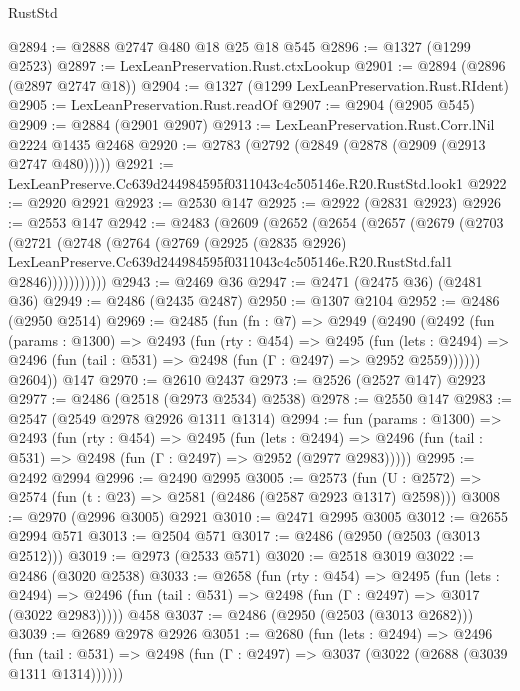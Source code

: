 \begin{lexlean}{RustStd}
\begin{coremodule}
@2894 := @2888 @2747 @480 @18 @25 @18 @545
@2896 := @1327 (@1299 @2523)
@2897 := LexLeanPreservation.Rust.ctxLookup
@2901 := @2894 (@2896 (@2897 @2747 @18))
@2904 := @1327 (@1299 LexLeanPreservation.Rust.RIdent)
@2905 := LexLeanPreservation.Rust.readOf
@2907 := @2904 (@2905 @545)
@2909 := @2884 (@2901 @2907)
@2913 := LexLeanPreservation.Rust.Corr.lNil @2224 @1435 @2468
@2920 := @2783 (@2792 (@2849 (@2878 (@2909 (@2913 @2747 @480)))))
@2921 := LexLeanPreserve.Cc639d244984595f0311043c4c505146e.R20.RustStd.look1
@2922 := @2920 @2921
@2923 := @2530 @147
@2925 := @2922 (@2831 @2923)
@2926 := @2553 @147
@2942 := @2483
    (@2609
      (@2652
        (@2654
          (@2657
            (@2679
              (@2703
                (@2721
                  (@2748
                    (@2764
                      (@2769
                        (@2925
                          (@2835 @2926)
                          LexLeanPreserve.Cc639d244984595f0311043c4c505146e.R20.RustStd.fal1
                          @2846)))))))))))
@2943 := @2469 @36
@2947 := @2471 (@2475 @36) (@2481 @36)
@2949 := @2486 (@2435 @2487)
@2950 := @1307 @2104
@2952 := @2486 (@2950 @2514)
@2969 := @2485
    (fun (fn : @7) =>
    @2949
      (@2490
        (@2492
          (fun (params : @1300) =>
          @2493
            (fun (rty : @454) =>
            @2495
              (fun (lets : @2494) =>
              @2496 (fun (tail : @531) => @2498 (fun (Γ : @2497) => @2952 @2559))))))
        @2604))
    @147
@2970 := @2610 @2437
@2973 := @2526 (@2527 @147) @2923
@2977 := @2486 (@2518 (@2973 @2534) @2538)
@2978 := @2550 @147
@2983 := @2547 (@2549 @2978 @2926 @1311 @1314)
@2994 := fun (params : @1300) =>
  @2493
    (fun (rty : @454) =>
    @2495
      (fun (lets : @2494) =>
      @2496 (fun (tail : @531) => @2498 (fun (Γ : @2497) => @2952 (@2977 @2983)))))
@2995 := @2492 @2994
@2996 := @2490 @2995
@3005 := @2573 (fun (U : @2572) => @2574 (fun (t : @23) => @2581 (@2486 (@2587 @2923 @1317) @2598)))
@3008 := @2970 (@2996 @3005) @2921
@3010 := @2471 @2995 @3005
@3012 := @2655 @2994 @571
@3013 := @2504 @571
@3017 := @2486 (@2950 (@2503 (@3013 @2512)))
@3019 := @2973 (@2533 @571)
@3020 := @2518 @3019
@3022 := @2486 (@3020 @2538)
@3033 := @2658
    (fun (rty : @454) =>
    @2495
      (fun (lets : @2494) =>
      @2496 (fun (tail : @531) => @2498 (fun (Γ : @2497) => @3017 (@3022 @2983)))))
    @458
@3037 := @2486 (@2950 (@2503 (@3013 @2682)))
@3039 := @2689 @2978 @2926
@3051 := @2680
    (fun (lets : @2494) =>
    @2496
      (fun (tail : @531) => @2498 (fun (Γ : @2497) => @3037 (@3022 (@2688 (@3039 @1311 @1314))))))

\end{coremodule}
\end{lexlean}
